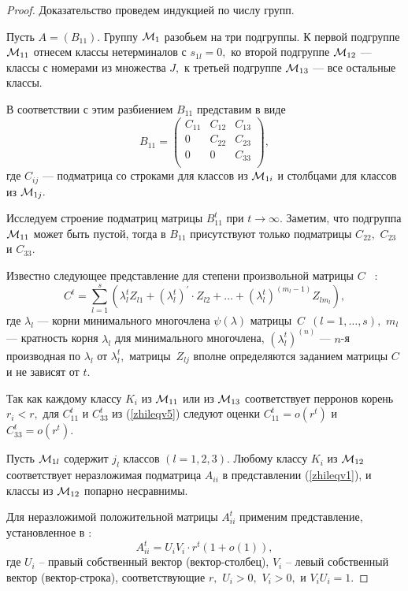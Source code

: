 \documentclass[10pt]{article}
\begin{document}
\begin{proof}
Доказательство проведем индукцией по числу групп. 

Пусть $A=(B_{11}).$ Группу ${\cal M}_1$ разобьем на три подгруппы. К первой подгруппе ${\cal M}_{11}$ отнесем классы нетерминалов с $s_{1l}=0,$ ко второй подгруппе ${\cal M}_{12}$ --- классы с номерами из множества $J,$ к третьей подгруппе ${\cal M}_{13}$ --- все остальные классы.

В соответствии с этим разбиением $B_{11}$ представим в виде
$$
B_{11}=\left(
\begin{array}{ccc} 
C_{11} & C_{12} & C_{1 3} \\
0 &    C_{22}   & C_{2 3} \\
0 & 0 &   C_{3 3} \\
\end{array}
\right)
,
$$
где $C_{ij}$ --- подматрица со строками для классов из ${\cal M}_{1i}$ и столбцами для классов из ${\cal M}_{1j}.$

Исследуем строение подматриц матрицы $B_{11}^t$ при $t \rightarrow \infty.$ Заметим, что подгруппа ${\cal M}_{11}$ может быть пустой, тогда в $B_{11}$ присутствуют только подматрицы $C_{22},$ $ C_{23}$ и $C_{33}.$

Известно следующее представление для степени произвольной матрицы $C$ ~\cite{zhilbib7}:
\begin{equation} \label{zhileqv5}
C^{t}=\sum_{l=1}^s\left(\lambda _l^t Z_{l1}+\left(\lambda _l^t\right)^\prime
\cdot Z_{l2}+
\ldots + \left(\lambda _l^t\right)^{(m_l-1)} Z_{lm_l}\right), %
\end{equation}
где $\lambda_l$ --- корни минимального многочлена $\psi(\lambda)$ матрицы~$C$
$\,(l=1,\ldots,s),$ %
$m_l$ --- кратность корня $\lambda_l$ для минимального многочлена,
$(\lambda _l^t)^{(n)}$ --- $n$-я производная по $\lambda _l$ от
$\lambda _l^t,$ матрицы~$Z_{lj}$ вполне определяются заданием матрицы $C$
и не зависят от $t.$ 

Так как каждому классу $K_i$ из ${\cal M}_{11}$ или из ${\cal M}_{13}$ соответствует перронов корень $r_i<r,$ для $C_{11}^t$ и $C_{33}^t$ из (\ref{zhileqv5}) следуют оценки $C_{11}^t=o(r^t)$ и $C_{33}^t=o(r^t).$

Пусть ${\cal M}_{1l}$ содержит $j_l$ классов $(l=1,2,3).$
Любому классу $K_i$ из ${\cal M}_{12}$ соответствует неразложимая подматрица $A_{ii}$ в представлении (\ref{zhileqv1}), и классы из ${\cal M}_{12}$ попарно несравнимы. 

Для неразложимой положительной матрицы $A_{ii}^t$ применим представление, установленное в \cite{zhilbib3}:
$$
A_{ii}^t=U_iV_i \cdot r^t (1+o(1)),
$$
где $U_i$ -- правый собственный вектор (вектор-столбец), $V_i$ -- левый собственный вектор (вектор-строка), соответствующие $r,$ $U_i>0,$ $V_i>0,$ и $V_iU_i=1.$
  

\end{proof}
\end{document}

